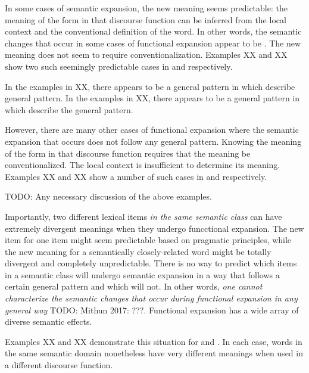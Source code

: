 
In some cases of semantic expansion, the new meaning seems predictable: the meaning of the form in that discourse function can be inferred from the local context and the conventional definition of the word. In other words, the semantic changes that occur in some cases of functional expansion appear to be . The new meaning does not seem to require conventionalization. Examples {{XX}} and {{XX}} show two such seemingly predictable cases in  and  respectively.


In the  examples in {{XX}}, there appears to be a general pattern in which {{describe general pattern}}. In the  examples in {{XX}}, there appears to be a general pattern in which {{describe the general pattern}}.

However, there are many other cases of functional expansion where the semantic expansion that occurs does not follow any general pattern. Knowing the meaning of the form in that discourse function requires that the meaning be conventionalized. The local context is insufficient to determine its meaning. Examples {{XX}} and {{XX}} show a number of such cases in  and  respectively.


{{TODO: Any necessary discussion of the above examples.}}

Importantly, two different lexical items \emph{in the same semantic class} can have extremely divergent meanings when they undergo funcctional expansion. The new item for one item might seem predictable based on pragmatic principles, while the new meaning for a semantically closely-related word might be totally divergent and completely unpredictable. There is no way to predict which items in a semantic class will undergo semantic expansion in a way that follows a certain general pattern and which will not. In other words, \emph{one cannot characterize the semantic changes that occur during functional expansion in any general way} {{TODO: Mithun 2017: ???}}. Functional expansion has a wide array of diverse semantic effects.

Examples {{XX}} and {{XX}} demonstrate this situation for  and . In each case, words in the same semantic domain nonetheless have very different meanings when used in a different discourse function.

